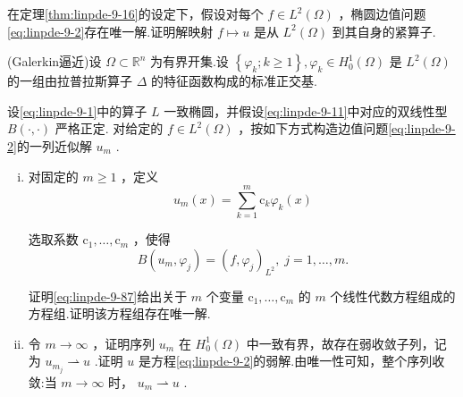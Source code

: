 \begin{rbhw}
在定理\ref{thm:linpde-9-16}的设定下，假设对每个 $f \in  {L}^{2}\left( \Omega \right)$ ，椭圆边值问题\eqref{eq:linpde-9-2}存在唯一解.证明解映射 $f \mapsto  u$ 是从 ${L}^{2}\left( \Omega \right)$ 到其自身的紧算子.

\end{rbhw}

\begin{rbhw}
(Galerkin逼近)设 $\Omega  \subset  {\mathbb{R}}^{n}$ 为有界开集.设 $\left\{  {{\varphi }_{k};k \geq  1}\right\}  ,{\varphi }_{k} \in  {H}_{0}^{1}\left( \Omega \right)$ 是 ${L}^{2}\left( \Omega \right)$ 的一组由拉普拉斯算子 $\Delta$ 的特征函数构成的标准正交基.

设\eqref{eq:linpde-9-1}中的算子 $L$ 一致椭圆，并假设\eqref{eq:linpde-9-11}中对应的双线性型 $B\left(  {\cdot , \cdot  }\right)$ 严格正定.
对给定的 $f \in  {L}^{2}\left( \Omega \right)$ ，按如下方式构造边值问题\eqref{eq:linpde-9-2}的一列近似解 ${u}_{m}$ .
\begin{enumerate}[(i)]
    \item 对固定的 $m \geq  1$ ，定义
\begin{equation}\tag{9.86}\label{eq:linpde-9-86}
{u}_{m}\left( x\right)  = \sum_{{k = 1}}^{m}{\mathrm{c}}_{k}{\varphi }_{k}\left( x\right)
\end{equation}

选取系数 ${\mathrm{c}}_{1},\ldots ,{\mathrm{c}}_{m}$ ，使得
\begin{equation}\tag{9.87}\label{eq:linpde-9-87}
B\left(  {{u}_{m},{\varphi }_{j}}\right)   = {\left( f,{\varphi }_{j}\right) }_{{L}^{2}},\;j = 1,\ldots ,m.
\end{equation}

证明\eqref{eq:linpde-9-87}给出关于 $m$ 个变量 ${\mathrm{c}}_{1},\ldots ,{\mathrm{c}}_{m}$ 的 $m$ 个线性代数方程组成的方程组.证明该方程组存在唯一解.
    \item 令 $m \rightarrow  \infty$ ，证明序列 ${u}_{m}$ 在 ${H}_{0}^{1}\left( \Omega \right)$ 中一致有界，故存在弱收敛子列，记为 ${u}_{{m}_{j}} \rightharpoonup  u$ .证明 $u$ 是方程\eqref{eq:linpde-9-2}的弱解.由唯一性可知，整个序列收敛:当 $m \rightarrow  \infty$ 时， ${u}_{m} \rightharpoonup  u$ .
\end{enumerate}

\end{rbhw}

